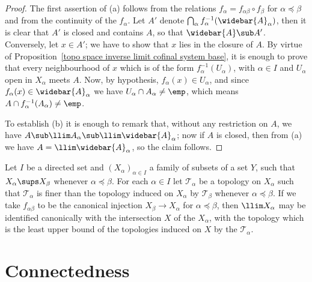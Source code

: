 \begin{proof}
The first assertion of (a) follows from the relations $f_\alpha=f_{\alpha\beta}\circ f_\beta$ for $\alpha\preceq\beta$ and from the continuity of the $f_\alpha$. Let $A'$ denote $\bigcap_{\alpha}f_\alpha^{-1}(\widebar{A}_\alpha)$, then it is clear that $A'$ is closed and contains $A$, so that $\widebar{A}\sub A'$. Conversely, let $x\in A'$; we have to show that $x$ lies in the closure of $A$. By virtue of Proposition~\ref{topo space inverse limit cofinal system base}, it is enough to prove that every neighbourhood of $x$ which is of the form $f_\alpha^{-1}(U_\alpha)$, with $\alpha\in I$ and $U_\alpha$ open in $X_\alpha$ meets $A$. Now, by hypothesis, $f_\alpha(x)\in U_\alpha$, and since $f_\alpha(x)\in \widebar{A}_\alpha$ we have $U_\alpha\cap A_\alpha\neq\emp$, which means $A\cap f_\alpha^{-1}(A_\alpha)\neq\emp$.\par
To establish (b) it is enough to remark that, without any restriction on $A$, we have $A\sub\llim A_\alpha\sub\llim\widebar{A}_\alpha$; now if $A$ is closed, then from (a) we have $A=\llim\widebar{A}_\alpha$, so the claim follows.
\end{proof}
\begin{example}
Let $I$ be a directed set and $(X_\alpha)_{\alpha\in I}$ a family of subsets of a set $Y$, such that $X_\alpha\sups X_\beta$ whenever $\alpha\preceq\beta$. For each $\alpha\in I$ let $\mathcal{T}_\alpha$ be a topology on $X_\alpha$ such that $\mathcal{T}_\alpha$ is finer than the topology induced on $X_\alpha$ by $\mathcal{T}_\beta$ whenever $\alpha\preceq\beta$. If we take $f_{\alpha\beta}$ to be the canonical injection $X_\beta\to X_\alpha$ for $\alpha\preceq\beta$, then $\llim X_\alpha$ may be identified canonically with the intersection $X$ of the $X_\alpha$, with the topology which is the least upper bound of the topologies induced on $X$ by the $\mathcal{T}_\alpha$.
\end{example}
\section{Connectedness}
